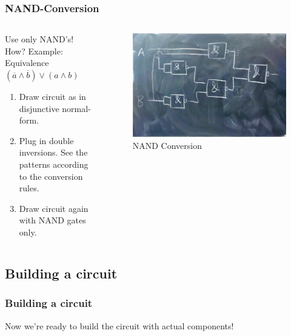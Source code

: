 \documentclass{beamer}
\begin{document}
\begin{frame}  \frametitle{NAND-Conversion}
  \begin{columns}
  \begin{column}{5cm}
  Use only NAND's! How?
    \newline Example: Equivalence
  \newline
  $(\overline{a}\land \overline{b})\lor(a\land b)$
  \newline
  \begin{enumerate}
   \item Draw circuit as in disjunctive normal-form.
   \item Plug in double inversions. See the patterns according to the conversion rules.
   \item Draw circuit again with NAND gates only.
  \end{enumerate}

  \end{column}
  
  \begin{column}{6cm}
    \begin{figure}[H]
      \centering
      \includegraphics[width=1\textwidth]{eq3}%
      \caption{NAND Conversion}%
      \label{fig:eq3}
    \end{figure}
  \end{column}
  \end{columns}  
\end{frame}

\subsection{Building a circuit}
\begin{frame}  \frametitle{Building a circuit}
 Now we're ready to build the circuit with actual components!
 
\end{frame}
\end{document}
